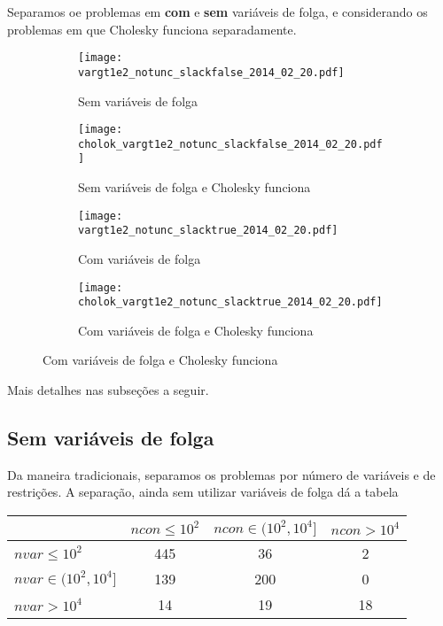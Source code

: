 \documentclass{article}
\renewcommand{\emph}[1]{\textbf{#1}}
\begin{document}
Separamos oe problemas em \emph{com} e \emph{sem} variáveis de folga, e
considerando os problemas em que Cholesky funciona separadamente.
\begin{figure}[H]
  \centering
  \begin{subfigure}{0.48\textwidth}
    \texttt{[image: vargt1e2\_notunc\_slackfalse\_2014\_02\_20.pdf]}
    \caption{Sem variáveis de folga}
  \end{subfigure}
  \begin{subfigure}{0.48\textwidth}
    \texttt{[image: cholok\_vargt1e2\_notunc\_slackfalse\_2014\_02\_20.pdf]}
    \caption{Sem variáveis de folga e Cholesky funciona}
  \end{subfigure}
  \begin{subfigure}{0.48\textwidth}
    \texttt{[image: vargt1e2\_notunc\_slacktrue\_2014\_02\_20.pdf]}
    \caption{Com variáveis de folga}
  \end{subfigure}
  \begin{subfigure}{0.48\textwidth}
    \texttt{[image: cholok\_vargt1e2\_notunc\_slacktrue\_2014\_02\_20.pdf]}
    \caption{Com variáveis de folga e Cholesky funciona}
  \end{subfigure}
\end{figure}

Mais detalhes nas subseções a seguir.

\newpage
\subsection{Sem variáveis de folga}

Da maneira tradicionais, separamos os problemas por número de variáveis e de
restrições. A separação, ainda sem utilizar variáveis de folga dá a tabela
\begin{center}
\begin{tabular}{|l|c|c|c|} \hline
& $ncon \leq 10^2$ & $ncon \in (10^2,10^4]$ & $ncon > 10^4$ \\ \hline
$nvar \leq 10^2$       & 445 &  36 &  2 \\ \hline
$nvar \in (10^2,10^4]$ & 139 & 200 &  0 \\ \hline
$nvar > 10^4$          &  14 &  19 & 18 \\ \hline
\end{tabular}
\end{center}
\end{document}
